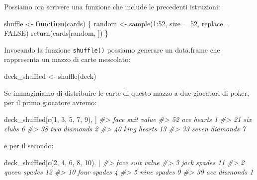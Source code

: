 \documentclass[
]{memoir}
\newenvironment{Shaded}{\begin{snugshade}}{\end{snugshade}}
\newcommand{\AttributeTok}[1]{\textcolor[rgb]{0.77,0.63,0.00}{#1}}
\newcommand{\CommentTok}[1]{\textcolor[rgb]{0.56,0.35,0.01}{\textit{#1}}}
\newcommand{\ConstantTok}[1]{\textcolor[rgb]{0.00,0.00,0.00}{#1}}
\newcommand{\ControlFlowTok}[1]{\textcolor[rgb]{0.13,0.29,0.53}{\textbf{#1}}}
\newcommand{\DecValTok}[1]{\textcolor[rgb]{0.00,0.00,0.81}{#1}}
\newcommand{\FunctionTok}[1]{\textcolor[rgb]{0.00,0.00,0.00}{#1}}
\newcommand{\NormalTok}[1]{#1}
\newcommand{\OtherTok}[1]{\textcolor[rgb]{0.56,0.35,0.01}{#1}}
\newcommand{\SpecialCharTok}[1]{\textcolor[rgb]{0.00,0.00,0.00}{#1}}
\theoremstyle{definition}
\theoremstyle{definition}
\theoremstyle{definition}
\theoremstyle{definition}
\theoremstyle{remark}
\begin{document}
Possiamo ora scrivere una funzione che include le precedenti istruzioni:

\begin{Shaded}
\begin{Highlighting}[]
\NormalTok{shuffle }\OtherTok{\textless{}{-}} \ControlFlowTok{function}\NormalTok{(cards) \{}
\NormalTok{  random }\OtherTok{\textless{}{-}} \FunctionTok{sample}\NormalTok{(}\DecValTok{1}\SpecialCharTok{:}\DecValTok{52}\NormalTok{, }\AttributeTok{size =} \DecValTok{52}\NormalTok{, }\AttributeTok{replace =} \ConstantTok{FALSE}\NormalTok{)}
  \FunctionTok{return}\NormalTok{(cards[random, ])}
\NormalTok{\}}
\end{Highlighting}
\end{Shaded}

Invocando la funzione \texttt{shuffle()} possiamo generare un data.frame che
rappresenta un mazzo di carte mescolato:

\begin{Shaded}
\begin{Highlighting}[]
\NormalTok{deck\_shuffled }\OtherTok{\textless{}{-}} \FunctionTok{shuffle}\NormalTok{(deck)}
\end{Highlighting}
\end{Shaded}

Se immaginiamo di distribuire le carte di questo mazzo a due giocatori
di poker, per il primo giocatore avremo:

\begin{Shaded}
\begin{Highlighting}[]
\NormalTok{deck\_shuffled[}\FunctionTok{c}\NormalTok{(}\DecValTok{1}\NormalTok{, }\DecValTok{3}\NormalTok{, }\DecValTok{5}\NormalTok{, }\DecValTok{7}\NormalTok{, }\DecValTok{9}\NormalTok{), ]}
\CommentTok{\#\textgreater{}     face     suit value}
\CommentTok{\#\textgreater{} 52   ace   hearts     1}
\CommentTok{\#\textgreater{} 21   six    clubs     6}
\CommentTok{\#\textgreater{} 38   two diamonds     2}
\CommentTok{\#\textgreater{} 40  king   hearts    13}
\CommentTok{\#\textgreater{} 33 seven diamonds     7}
\end{Highlighting}
\end{Shaded}

e per il secondo:

\begin{Shaded}
\begin{Highlighting}[]
\NormalTok{deck\_shuffled[}\FunctionTok{c}\NormalTok{(}\DecValTok{2}\NormalTok{, }\DecValTok{4}\NormalTok{, }\DecValTok{6}\NormalTok{, }\DecValTok{8}\NormalTok{, }\DecValTok{10}\NormalTok{), ]}
\CommentTok{\#\textgreater{}     face     suit value}
\CommentTok{\#\textgreater{} 3   jack   spades    11}
\CommentTok{\#\textgreater{} 2  queen   spades    12}
\CommentTok{\#\textgreater{} 10  four   spades     4}
\CommentTok{\#\textgreater{} 5   nine   spades     9}
\CommentTok{\#\textgreater{} 39   ace diamonds     1}
\end{Highlighting}
\end{Shaded}
\end{document}
